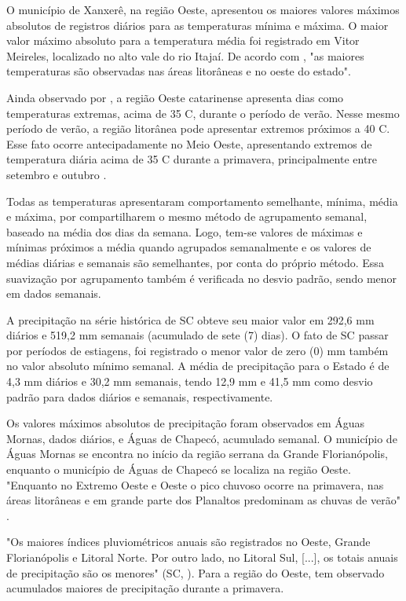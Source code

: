 \indent O município de Xanxerê, na região Oeste, apresentou os maiores valores máximos absolutos de registros diários para as temperaturas mínima e máxima. O maior valor máximo absoluto para a temperatura média foi registrado em Vitor Meireles, localizado no alto vale do rio Itajaí. De acordo com , "as maiores temperaturas são observadas nas áreas litorâneas e no oeste do estado".

\indent Ainda observado por , a região Oeste catarinense apresenta dias como temperaturas extremas, acima de 35 C, durante o período de verão. Nesse mesmo período de verão, a região litorânea pode apresentar extremos próximos a 40 C. Esse fato ocorre antecipadamente no Meio Oeste, apresentando extremos de temperatura diária acima de 35 C durante a primavera, principalmente entre setembro e outubro \cite{Guerra2023Regionalizacao}.

\indent Todas as temperaturas apresentaram comportamento semelhante, mínima, média e máxima, por compartilharem o mesmo método de agrupamento semanal, baseado na média dos dias da semana. Logo, tem-se valores de máximas e mínimas próximos a média quando agrupados semanalmente e os valores de médias diárias e semanais são semelhantes, por conta do próprio método. Essa suavização por agrupamento também é verificada no desvio padrão, sendo menor em dados semanais. 

\indent A precipitação na série histórica de \acrlong{SC} obteve seu maior valor em 292,6 mm diários e 519,2 mm semanais (acumulado de sete (7) dias). O fato de  \acrlong{SC} passar por períodos de estiagens, foi registrado o menor valor de zero (0) mm também no valor absoluto mínimo semanal. A média de precipitação para o Estado é de 4,3 mm diários e 30,2 mm semanais, tendo 12,9 mm e 41,5 mm como desvio padrão para dados diários e semanais, respectivamente.

\indent Os valores máximos absolutos de precipitação foram observados em Águas Mornas, dados diários, e Águas de Chapecó, acumulado semanal. O município de Águas Mornas se encontra no início da região serrana da Grande Florianópolis, enquanto o município de Águas de Chapecó se localiza na região Oeste. "Enquanto no Extremo Oeste e Oeste o pico chuvoso ocorre na primavera, nas áreas litorâneas e em grande parte dos Planaltos predominam as chuvas de verão" \cite{Guerra2023Regionalizacao}.

\indent "Os maiores índices pluviométricos anuais são registrados no Oeste, Grande Florianópolis e Litoral Norte. Por outro lado, no Litoral Sul, [...], os totais anuais de precipitação são os menores" (\acrlong{SC}, \citeyear{AtlasSCnatureza}). Para a região do Oeste, \cite{Guerra2023Regionalizacao} tem observado acumulados maiores de precipitação durante a primavera.


